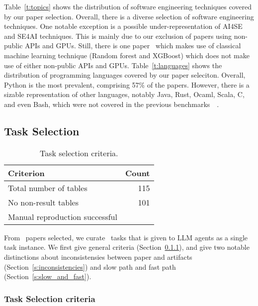 Table~\ref{t:topics} shows the distribution of software engineering techniques covered by our paper selection.
Overall, there is a diverse selection of software engineering techniques.
One notable exception is a possible under-representation of AI4SE and SE4AI techniques.
This is mainly due to our exclusion of papers using non-public APIs and GPUs.
Still, there is one paper~\cite{DBLP:conf/kbse/LeeJL24} which makes use of classical machine learning technique (Random forest and XGBoost) which does not make use of either non-public APIs and GPUs.
Table~\ref{t:languages} shows the distribution of programming languages covered by our paper seleciton.
Overall, Python is the most prevalent, comprising 57\% of the papers.
However, there is a sizable representation of other languages, notably Java, Rust, Ocaml, Scala, C, and even Bash, which were not covered in the previous benchmarks~~\cite{DBLP:conf/emnlp/BoginYG0BCSK24, DBLP:journals/tmlr/SiegelKNSN24, DBLP:conf/acl/HuZLWPK25}.

\subsection{Task Selection}
\label{s:task_select}

\begin{table}[t]
  \caption{Task selection criteria.}
  \label{t:task_select}
  \centering
  \begin{tabular}{@{}l r@{}}
    \toprule
    Criterion & Count \\
    \midrule
    Total number of tables & 115 \\
    No non-result tables & 101 \\
    Manual reproduction successful & \tablesetsize \\
    \bottomrule
  \end{tabular}
\end{table}

From \papersetsize~papers selected, we curate \tablesetsize~tasks that is given to LLM agents as a single task instance.
We first give general criteria (Section~\ref{s:task_selection_criteria}), and give two notable distinctions about inconsistensies between paper and artifacts (Section~\ref{s:inconsistencies}) and slow path and fast path (Section~\ref{s:slow_and_fast}).

\subsubsection{Task Selection criteria}
\label{s:task_selection_criteria}

